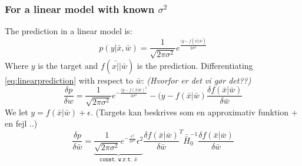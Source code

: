 \subsubsection{For a linear model with known $\sigma^2$}
The prediction in a linear model is:
\begin{equation}
p(y|\bar{x},\bar{w}) = \frac{1}{\sqrt{2 \pi \sigma^2}} e^{\frac{(y-f(\bar{x|}|\bar{w})}{2 \sigma^2}} \label{linearprediction}
\end{equation}
Where $y$ is the target and $f(\bar{x|}|\bar{w})$ is the prediction. Differentiating \eqref{eq:linearprediction} with respect to $\bar{w}$: \emph{(Hvorfor er det vi gør det??)}
\begin{equation}
\frac{\delta p}{\delta w} = \frac{1}{\sqrt{2 \pi \sigma^2}} e^{-\frac{(y-f(\bar{x}|\bar{w})^2}{2\sigma^2}}-(y-f(\bar{x}|\bar{w}) \frac{\delta f(\bar{x}|\bar{w})}{\delta \bar{w}}
\end{equation}
We let $y = f(\bar{x}|\bar{w})+ \epsilon$. (Targets kan beskrives som en approximativ funktion + en fejl ..)
\begin{equation}
\frac{\delta p}{\delta \bar{w}} = \underbrace{ 
\frac{1}{\sqrt{2\pi \sigma^2}}
e^{-\frac{\epsilon^2}{2 \sigma^2}}\epsilon^2
}_{\texttt{const. w.r.t. } \bar{x} 
} 
\frac{\delta f(\bar{x}|\bar{w})}{\delta \bar{w}}^T \bar{\bar{H}}_0^{-1} \frac{\delta f(\bar{x}|\bar{w})}{\delta \bar{w}}
\end{equation}




